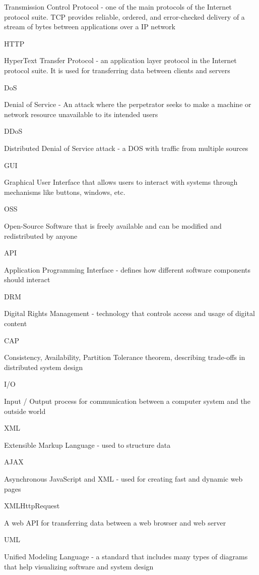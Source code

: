 \documentclass[]{final}
\begin{document}
Transmission Control Protocol - one of the main protocols of the Internet protocol suite. TCP provides
reliable, ordered, and error-checked delivery of a stream of bytes between applications over a IP network

HTTP

HyperText Transfer Protocol - an application layer protocol in the Internet protocol suite.
It is used for transferring data between clients and servers

DoS

Denial of Service - An attack where the perpetrator seeks to make a machine or network resource unavailable
to its intended users

DDoS

Distributed Denial of Service attack - a DOS with traffic from multiple sources

GUI

Graphical User Interface that allows users to interact with systems through mechanisms like buttons, windows, etc.

OSS

Open-Source Software that is freely available and can be modified and redistributed by anyone

API

Application Programming Interface - defines how different software components should interact

DRM

Digital Rights Management - technology that controls access and usage of digital content

CAP

Consistency, Availability, Partition Tolerance theorem, describing trade-offs in distributed system design

I/O

Input / Output process for communication between a computer system and the outside world

XML

Extensible Markup Language - used to structure data

AJAX

Asynchronous JavaScript and XML - used for creating fast and dynamic web pages

XMLHttpRequest

A web API for transferring data between a web browser and web server

UML

Unified Modeling Language - a standard that includes many types of diagrams that help visualizing software and system design
\end{document}
